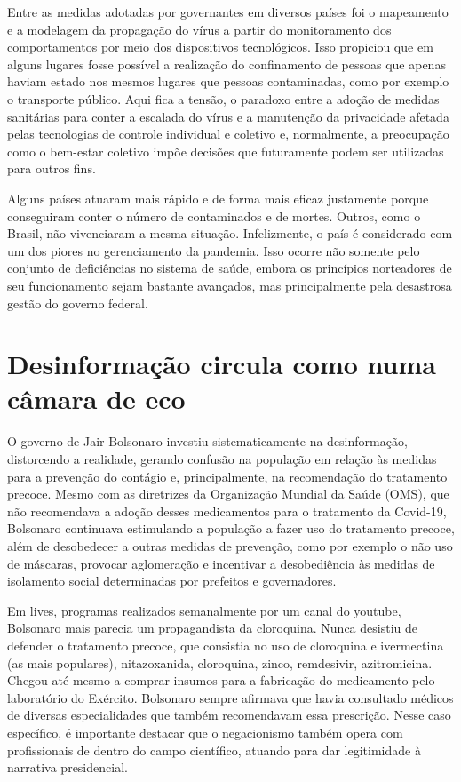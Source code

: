 Entre as medidas adotadas por governantes em diversos países foi o
mapeamento e a modelagem da propagação do vírus a partir do
monitoramento dos comportamentos por meio dos dispositivos tecnológicos.
Isso propiciou que em alguns lugares fosse possível a realização do
confinamento de pessoas que apenas haviam estado nos mesmos lugares que
pessoas contaminadas, como por exemplo o transporte público. Aqui fica a
tensão, o paradoxo entre a adoção de medidas sanitárias para conter a
escalada do vírus e a manutenção da privacidade afetada pelas
tecnologias de controle individual e coletivo e, normalmente, a
preocupação como o bem-estar coletivo impõe decisões que futuramente
podem ser utilizadas para outros fins.

Alguns países atuaram mais rápido e de forma mais eficaz justamente
porque conseguiram conter o número de contaminados e de mortes. Outros,
como o Brasil, não vivenciaram a mesma situação. Infelizmente, o país é
considerado com um dos piores no gerenciamento da pandemia. Isso ocorre
não somente pelo conjunto de deficiências no sistema de saúde, embora os
princípios norteadores de seu funcionamento sejam bastante avançados,
mas principalmente pela desastrosa gestão do governo federal.

\section{Desinformação circula como numa câmara de eco}

O governo de Jair Bolsonaro investiu sistematicamente na desinformação,
distorcendo a realidade, gerando confusão na população em relação às
medidas para a prevenção do contágio e, principalmente, na recomendação
do tratamento precoce. Mesmo com as diretrizes da Organização Mundial da
Saúde (OMS), que não recomendava a adoção desses medicamentos para o
tratamento da Covid-19, Bolsonaro continuava estimulando a população a
fazer uso do tratamento precoce, além de desobedecer a outras medidas de
prevenção, como por exemplo o não uso de máscaras, provocar aglomeração
e incentivar a desobediência às medidas de isolamento social
determinadas por prefeitos e governadores.

Em lives, programas realizados semanalmente por um canal do youtube,
Bolsonaro mais parecia um propagandista da cloroquina. Nunca desistiu de
defender o tratamento precoce, que consistia no uso de cloroquina e
ivermectina (as mais populares), nitazoxanida, cloroquina, zinco,
remdesivir, azitromicina. Chegou até mesmo a comprar insumos para a
fabricação do medicamento pelo laboratório do Exército. Bolsonaro sempre
afirmava que havia consultado médicos de diversas especialidades que
também recomendavam essa prescrição. Nesse caso específico, é importante
destacar que o negacionismo também opera com profissionais de dentro do
campo científico, atuando para dar legitimidade à narrativa
presidencial.

